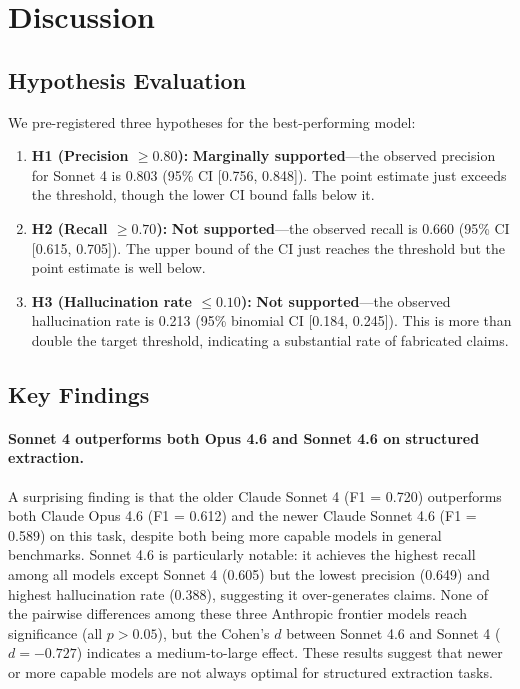 \documentclass[11pt,a4paper]{article}
\begin{document}
\section{Discussion}
\label{sec:discussion}

\subsection{Hypothesis Evaluation}

We pre-registered three hypotheses for the best-performing model:

\begin{enumerate}
  \item \textbf{H1 (Precision $\geq 0.80$):}
    \textbf{Marginally supported}---the observed precision for Sonnet 4 is
    0.803 (95\% CI [0.756, 0.848]).  The point estimate just exceeds
    the threshold, though the lower CI bound falls below it.
  \item \textbf{H2 (Recall $\geq 0.70$):}
    \textbf{Not supported}---the observed recall is
    0.660 (95\% CI [0.615, 0.705]).  The upper bound of the CI just
    reaches the threshold but the point estimate is well below.
  \item \textbf{H3 (Hallucination rate $\leq 0.10$):}
    \textbf{Not supported}---the observed hallucination rate is
    0.213 (95\% binomial CI [0.184, 0.245]).  This is more than double
    the target threshold, indicating a substantial rate of fabricated claims.
\end{enumerate}

\subsection{Key Findings}

\paragraph{Sonnet 4 outperforms both Opus 4.6 and Sonnet 4.6 on structured extraction.}
A surprising finding is that the older Claude Sonnet 4 (F1 = 0.720)
outperforms both Claude Opus 4.6 (F1 = 0.612) and the newer Claude
Sonnet 4.6 (F1 = 0.589) on this task, despite both being more capable
models in general benchmarks.  Sonnet 4.6 is particularly notable: it
achieves the highest recall among all models except Sonnet 4 (0.605) but
the lowest precision (0.649) and highest hallucination rate (0.388),
suggesting it over-generates claims.  None of the pairwise differences
among these three Anthropic frontier models reach significance (all
$p > 0.05$), but the Cohen's $d$ between Sonnet 4.6 and Sonnet 4
($d = -0.727$) indicates a medium-to-large effect.  These results suggest
that newer or more capable models are not always optimal for structured
extraction tasks.
\end{document}
